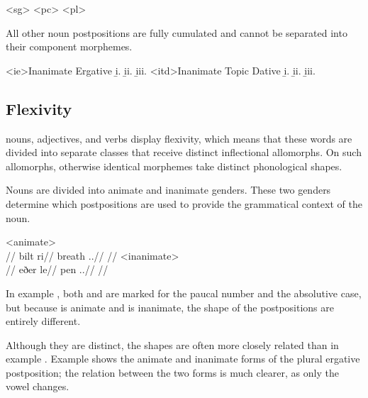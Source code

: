 	\a<sg>  
	\a<pc>  
	\a<pl>  
\xe

All other noun postpositions are fully cumulated and cannot be separated into their component morphemes.

	\a<ie>Inanimate Ergative
	\beginsubsub
		\b{i.}  
		\b{ii.}  
		\b{iii.}  
	\endsubsub
	\a<itd>Inanimate Topic Dative
	\beginsubsub
		\b{i.}  
		\b{ii.}  
		\b{iii.}  
	\endsubsub
\xe


\subsection{Flexivity}
\label{sec:flexivity}

\langtvk{} nouns, adjectives, and verbs display flexivity, which means that these words are divided into separate classes that receive distinct inflectional allomorphs. On such allomorphs, otherwise identical morphemes take distinct phonological shapes.

Nouns are divided into animate and inanimate genders. These two genders determine which postpositions are used to provide the grammatical context of the noun.

	\a<animate>\begingl
		\glpreamble{}\\
		//
		\gla bilt ri//
		\glb breath \An.\Pc.\Abs//
		\glft {}//
	\endgl
	\a<inanimate>\begingl
		\glpreamble{}\\
		//
		\gla eðer le//
		\glb pen \In.\Pc.\Abs//
		\glft {}//
	\endgl
\xe

In example , both  and  are marked for the paucal number and the absolutive case, but because  is animate and  is inanimate, the shape of the postpositions are entirely different.

Although they are distinct, the shapes are often more closely related than in example . Example  shows the animate and inanimate forms of the plural ergative postposition; the relation between the two forms is much clearer, as only the vowel changes.

